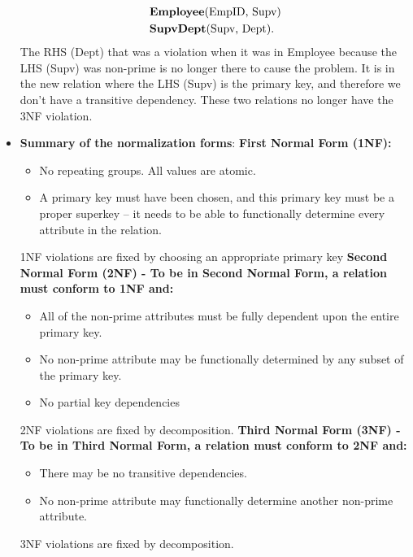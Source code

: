 \documentclass{report}
\begin{document}
\begin{itemize}
\begin{align*}
                &\text{\textbf{Employee}(EmpID, Supv)} \\
                &\text{\textbf{SupvDept}(Supv, Dept)}
            .\end{align*}
            \bigbreak \noindent 
            The RHS (Dept) that was a violation when it was in Employee because the LHS (Supv) was non-prime is no longer
            there to cause the problem. It is in the new relation where the LHS (Supv) is the primary key, and therefore we
            don’t have a transitive dependency. These two relations no longer have the 3NF violation.
        \item \textbf{Summary of the normalization forms}:
            \bigbreak \noindent 
            \textbf{First Normal Form (1NF):}
            \begin{itemize}
                \item No repeating groups. All values are atomic.
                \item A primary key must have been chosen, and this primary key must be a proper superkey – it needs to be able to functionally determine every attribute in the relation.
            \end{itemize}
            1NF violations are fixed by choosing an appropriate primary key
            \bigbreak \noindent 
            \textbf{Second Normal Form (2NF) - To be in Second Normal Form, a relation must conform to 1NF and:}
            \begin{itemize}
                \item All of the non-prime attributes must be fully dependent upon the entire primary key.
                \item No non-prime attribute may be functionally determined by any subset of the primary key.
                \item No partial key dependencies
            \end{itemize}
            \bigbreak \noindent 
            2NF violations are fixed by decomposition.
            \bigbreak \noindent 
            \textbf{Third Normal Form (3NF) - To be in Third Normal Form, a relation must conform to 2NF and:}
            \begin{itemize}
                \item There may be no transitive dependencies.
                \item No non-prime attribute may functionally determine another non-prime attribute.
            \end{itemize}
            \bigbreak \noindent 
            3NF violations are fixed by decomposition.




    \end{itemize}
\end{document}
